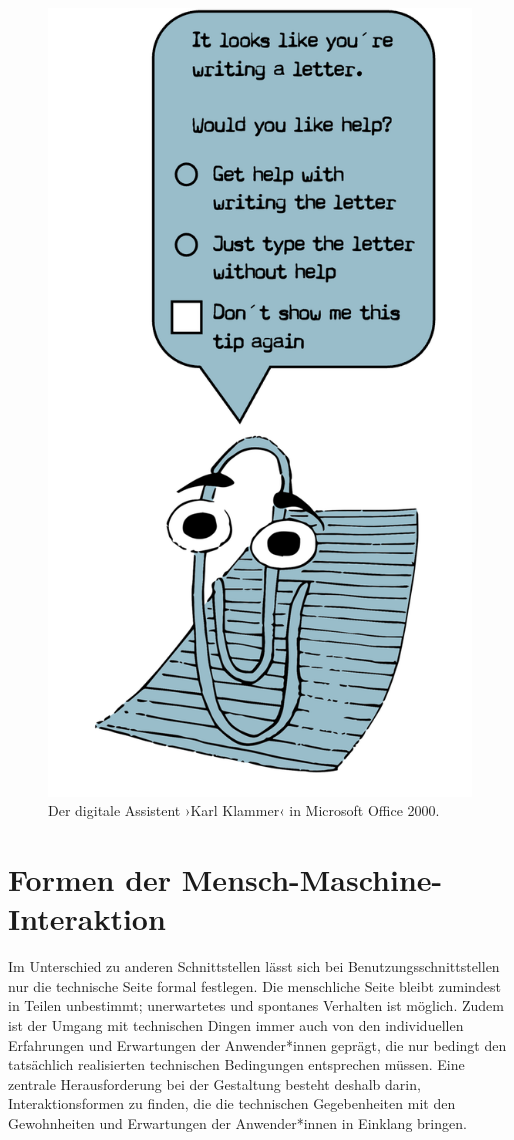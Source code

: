 \documentclass[
  a4paper,
]{book}
\begin{document}
\begin{figure}

{\centering \includegraphics[width=0.5\linewidth]{Figures/11-02-Karl-Klammer} 

}

\caption{ Der digitale Assistent ›Karl Klammer‹ in Microsoft Office 2000.}\label{fig:fig18}
\end{figure}

\section{Formen der Mensch-Maschine-Interaktion}\label{formen-der-mensch-maschine-interaktion}

Im Unterschied zu anderen Schnittstellen lässt sich bei Benutzungsschnittstellen nur die technische Seite formal festlegen. Die menschliche Seite bleibt zumindest in Teilen unbestimmt; unerwartetes und spontanes Verhalten ist möglich. Zudem ist der Umgang mit technischen Dingen immer auch von den individuellen Erfahrungen und Erwartungen der Anwender*innen geprägt, die nur bedingt den tatsächlich realisierten technischen Bedingungen entsprechen müssen. Eine zentrale Herausforderung bei der Gestaltung besteht deshalb darin, Interaktionsformen zu finden, die die technischen Gegebenheiten mit den Gewohnheiten und Erwartungen der Anwender*innen in Einklang bringen.
\end{document}
